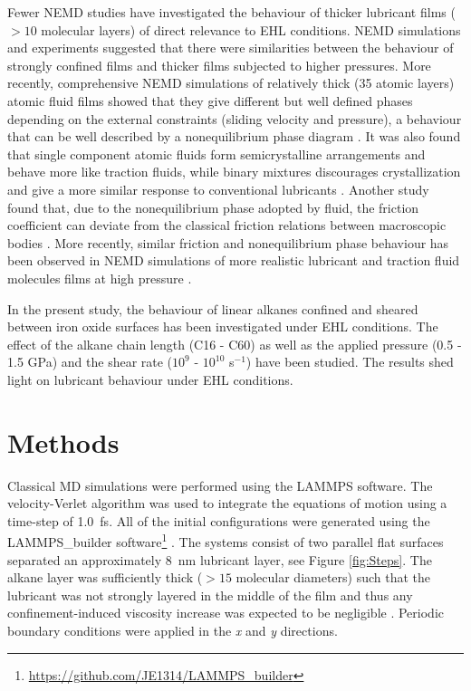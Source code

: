 \documentclass[aps,prb,reprint,superscriptaddress, a4paper]{revtex4-1}
\begin{document}
Fewer NEMD studies have investigated the behaviour of thicker lubricant films ($> 10$ molecular layers) of direct relevance to EHL conditions. NEMD simulations \cite{Thompson1992,Robbins1996} and experiments \cite{VanAlsten1988} suggested that there were similarities between the behaviour of strongly confined films and thicker films subjected to higher pressures. More recently, comprehensive NEMD simulations of relatively thick (35 atomic layers) atomic fluid films showed that they give different but well defined phases depending on the external constraints (sliding velocity and pressure), a behaviour that can be well described by a nonequilibrium phase diagram \cite{Heyes2012}. It was also found that single component atomic fluids form semicrystalline arrangements and behave more like traction fluids, while binary mixtures discourages crystallization and give a more similar response to conventional lubricants \cite{Gattinoni2013}. Another study found that, due to the nonequilibrium phase adopted by fluid, the friction coefficient can deviate from the classical friction relations between macroscopic bodies \cite{Mackowiak2016}. More recently, similar friction and nonequilibrium phase behaviour has been observed in NEMD simulations of more realistic lubricant and traction fluid molecules films at high pressure \cite{Ewen2017a}.

In the present study, the behaviour of linear alkanes confined and sheared between iron oxide surfaces has been investigated under EHL conditions. The effect of the alkane chain length (C16 - C60) as well as the applied pressure (0.5 - 1.5 GPa) and the shear rate ($10^{9}$ - $10^{10}$ s$^{-1}$) have been studied. The results shed light on lubricant behaviour under EHL conditions.

\section{Methods}

Classical MD simulations were performed using the LAMMPS \cite{Plimpton1995} software. The velocity-Verlet algorithm was used to integrate the equations of motion using a  time-step of \SI{1.0}{\femto\second}. All of the initial configurations were generated using the LAMMPS\_builder software\footnote{\url{https://github.com/JE1314/LAMMPS_builder}} \cite{Ewen2017b,Jewett2013,HjorthLarsen2017}. The systems consist of two parallel flat surfaces separated an approximately \SI{8}{\nano\meter} lubricant layer, see Figure \ref{fig:Steps}. The alkane layer was sufficiently thick ($>15$ molecular diameters) such that the lubricant was not strongly layered in the middle of the film and thus any confinement-induced viscosity increase was expected to be negligible \cite{Gee1990}. Periodic boundary conditions were applied in the \emph{x} and \emph{y} directions.
\end{document}

